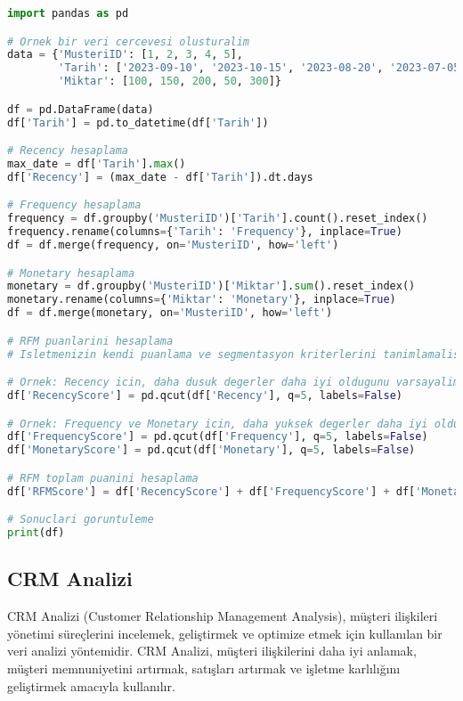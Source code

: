 \begin{lstlisting}[language=Python, caption=RFM analizi örneği]
import pandas as pd

# Ornek bir veri cercevesi olusturalim
data = {'MusteriID': [1, 2, 3, 4, 5],
        'Tarih': ['2023-09-10', '2023-10-15', '2023-08-20', '2023-07-05', '2023-09-25'],
        'Miktar': [100, 150, 200, 50, 300]}

df = pd.DataFrame(data)
df['Tarih'] = pd.to_datetime(df['Tarih'])

# Recency hesaplama
max_date = df['Tarih'].max()
df['Recency'] = (max_date - df['Tarih']).dt.days

# Frequency hesaplama
frequency = df.groupby('MusteriID')['Tarih'].count().reset_index()
frequency.rename(columns={'Tarih': 'Frequency'}, inplace=True)
df = df.merge(frequency, on='MusteriID', how='left')

# Monetary hesaplama
monetary = df.groupby('MusteriID')['Miktar'].sum().reset_index()
monetary.rename(columns={'Miktar': 'Monetary'}, inplace=True)
df = df.merge(monetary, on='MusteriID', how='left')

# RFM puanlarini hesaplama
# Isletmenizin kendi puanlama ve segmentasyon kriterlerini tanimlamalisiniz.

# Ornek: Recency icin, daha dusuk degerler daha iyi oldugunu varsayalim.
df['RecencyScore'] = pd.qcut(df['Recency'], q=5, labels=False)

# Ornek: Frequency ve Monetary icin, daha yuksek degerler daha iyi oldugunu varsayalim.
df['FrequencyScore'] = pd.qcut(df['Frequency'], q=5, labels=False)
df['MonetaryScore'] = pd.qcut(df['Monetary'], q=5, labels=False)

# RFM toplam puanini hesaplama
df['RFMScore'] = df['RecencyScore'] + df['FrequencyScore'] + df['MonetaryScore']

# Sonuclari goruntuleme
print(df)
\end{lstlisting}

\subsection{CRM Analizi}
CRM Analizi (Customer Relationship Management Analysis), müşteri ilişkileri yönetimi süreçlerini incelemek, geliştirmek ve optimize etmek için kullanılan bir veri analizi yöntemidir. CRM Analizi, müşteri ilişkilerini daha iyi anlamak, müşteri memnuniyetini artırmak, satışları artırmak ve işletme karlılığını geliştirmek amacıyla kullanılır.

